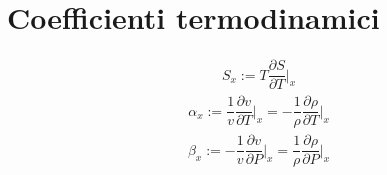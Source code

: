 \documentclass[letterpaper,10pt,english]{jupyterBook}
\begin{document}
\chapter{Coefficienti termodinamici}
\label{\detokenize{ch/coefficients:coefficienti-termodinamici}}\label{\detokenize{ch/coefficients:classical-thermodynamics-coefficients}}\label{\detokenize{ch/coefficients::doc}}
\sphinxAtStartPar
{}
\begin{equation*}
\begin{split}S_x := T \dfrac{\partial S}{\partial T}\Big|_x\end{split}
\end{equation*}
\sphinxAtStartPar
{}
\begin{equation*}
\begin{split}\alpha_x := \dfrac{1}{v} \dfrac{\partial v}{\partial T}\Big|_x = - \dfrac{1}{\rho} \dfrac{\partial \rho}{\partial T}\Big|_x\end{split}
\end{equation*}
\sphinxAtStartPar
{}
\begin{equation*}
\begin{split}\beta_x := - \dfrac{1}{v} \dfrac{\partial v}{\partial P}\Big|_x = \dfrac{1}{\rho} \dfrac{\partial \rho}{\partial P}\Big|_x\end{split}
\end{equation*}


\sphinxstepscope
\end{document}
